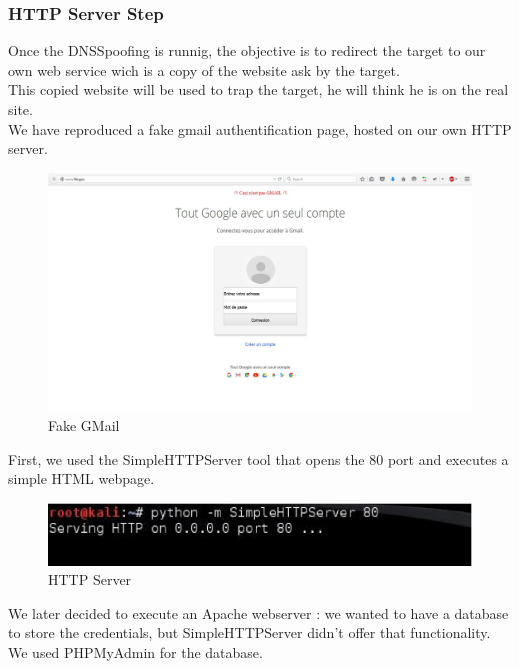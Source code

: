 \documentclass[a4paper, 11pt, oneside]{article}
\begin{document}
\subsubsection{HTTP Server Step}
Once the DNSSpoofing is runnig, the objective is to redirect the target to our own web service wich is a copy of the website ask by the target. \\
This copied website will be used to trap the target, he will think he is on the real site.\\
We have reproduced a fake gmail authentification page, hosted on our own HTTP server. \\

\begin{figure}[!h]
	\centering
	\includegraphics[scale=0.2]{../images/fakeGMail.eps}
	\caption{Fake GMail}
	\label{fakeGMail}
\end{figure}

First, we used the SimpleHTTPServer tool that opens the 80 port and executes a simple HTML webpage.\\
\begin{figure}[!h]
	\centering
	\includegraphics[scale=0.80]{../images/serverHTTP.eps}
	\caption{HTTP Server}
	\label{serverHTTP}
\end{figure}

We later decided to execute an Apache webserver : we wanted to have a database to store the credentials, but SimpleHTTPServer didn't offer that functionality. \\
We used PHPMyAdmin for the database.\\
\end{document}

